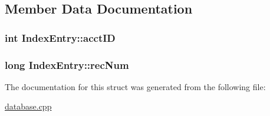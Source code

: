 \subsection{\-Member \-Data \-Documentation}
\hypertarget{struct_index_entry_aa5008695f70f365c7959d42ccca0fa13}{
\subsubsection[{acct\-I\-D}]{\setlength{\rightskip}{0pt plus 5cm}int {\bf \-Index\-Entry\-::acct\-I\-D}}}\label{struct_index_entry_aa5008695f70f365c7959d42ccca0fa13}
\hypertarget{struct_index_entry_a3f71077b699f2d718ca60df893c4c470}{
\subsubsection[{rec\-Num}]{\setlength{\rightskip}{0pt plus 5cm}long {\bf \-Index\-Entry\-::rec\-Num}}}\label{struct_index_entry_a3f71077b699f2d718ca60df893c4c470}


\-The documentation for this struct was generated from the following file\-:\begin{DoxyCompactItemize}
\item 
\hyperlink{database_8cpp}{database.\-cpp}\end{DoxyCompactItemize}

